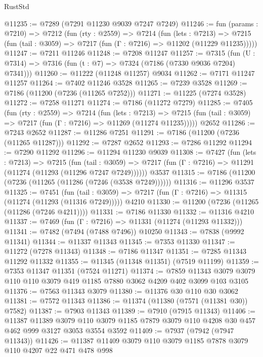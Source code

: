 \begin{lexlean}{RustStd}
\begin{coremodule}
{\begin{coremodule}
{{{{{{{{{{{{{{{{{{{{{{{{{{{{{{{{@11235 := @7289 (@7291 @11230 @9039 @7247 @7249)
@11246 := fun (params : @7210) =>
  @7212
    (fun (rty : @2559) =>
    @7214
      (fun (lets : @7213) =>
      @7215 (fun (tail : @3059) => @7217 (fun (Γ : @7216) => @11202 (@11229 @11235)))))
@11247 := @7211 @11246
@11248 := @7208 @11247
@11257 := @7315 (fun (U : @7314) => @7316 (fun (t : @7) => @7324 (@7186 (@7330 @9036 @7204) @7341)))
@11260 := @11222 (@11248 @11257) @9034
@11262 := @7171 @11247 @11257
@11264 := @7402 @11246 @3528
@11265 := @7239 @3528
@11269 := @7186 (@11200 (@7236 (@11265 @7252)))
@11271 := @11225 (@7274 @3528)
@11272 := @7258 @11271
@11274 := @7186 (@11272 @7279)
@11285 := @7405
    (fun (rty : @2559) =>
    @7214
      (fun (lets : @7213) =>
      @7215 (fun (tail : @3059) => @7217 (fun (Γ : @7216) => @11269 (@11274 @11235)))))
    @2652
@11286 := @7243 @2652
@11287 := @11286 @7251
@11291 := @7186 (@11200 (@7236 (@11265 @11287)))
@11292 := @7287 @2652
@11293 := @7286 @11292
@11294 := @7290 @11292
@11296 := @11294 @11230 @9039
@11308 := @7427
    (fun (lets : @7213) =>
    @7215
      (fun (tail : @3059) =>
      @7217 (fun (Γ : @7216) => @11291 (@11274 (@11293 (@11296 @7247 @7249))))))
    @3537
@11315 := @7186 (@11200 (@7236 (@11265 (@11286 (@7246 (@3538 @7249))))))
@11316 := @11296 @3537
@11325 := @7451
    (fun (tail : @3059) => @7217 (fun (Γ : @7216) => @11315 (@11274 (@11293 (@11316 @7249)))))
    @4210
@11330 := @11200 (@7236 (@11265 (@11286 (@7246 @4211))))
@11331 := @7186 @11330
@11332 := @11316 @4210
@11337 := @7469 (fun (Γ : @7216) => @11331 (@11274 (@11293 @11332)))
@11341 := @7482 (@7494 (@7488 @7496)) @10250
@11343 := @7838 (@9992 @11341)
@11344 := @11337 @11343
@11345 := @7353 @11330
@11347 := @11272 (@7278 @11343)
@11348 := @7186 @11347
@11351 := @7285 @11343 @11292 @11332
@11355 := @11345 (@11348 @11351) (@7519 @11199)
@11359 := @7353 @11347 @11351 (@7524 @11271)
@11374 := @7859
    @11343
    @3079
    @3079
    @110
    @110
    @3079
    @419
    @1185
    @7880
    @3062
    @4209
    @402
    @3099
    @103
    @3105
@11376 := @7563 @11343 @3079
@11380 := @11376 @30 @110 @30 @3062
@11381 := @7572 @11343
@11386 := @11374 (@11380 (@7571 (@11381 @30)) @7582)
@11387 := @7903 @11343
@11389 := @7910 (@7915 @11343)
@11406 := @11387
    @11389
    @3079
    @110
    @3079
    @1185
    @7879
    @3079
    @110
    @4208
    @30
    @457
    @462
    @999
    @3127
    @3053
    @3554
    @3592
@11409 := @7937 (@7942 (@7947 @11343))
@11426 := @11387
    @11409
    @3079
    @110
    @3079
    @1185
    @7878
    @3079
    @110
    @4207
    @22
    @471
    @478
    @998
}}}}}}}}}}}}}}}}}}}}}}}}}}}}}}}}
\end{coremodule}}
\end{coremodule}
\end{lexlean}
